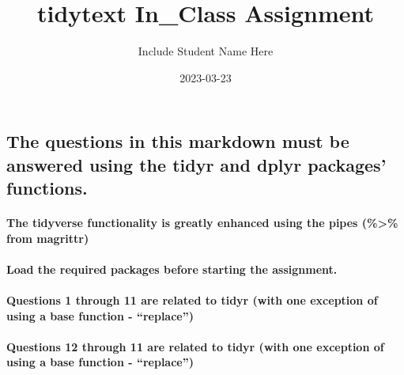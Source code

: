 \documentclass[
]{article}
\title{tidytext In\_Class Assignment}
\author{Include Student Name Here}
\date{2023-03-23}
\begin{document}
\maketitle

\hypertarget{the-questions-in-this-markdown-must-be-answered-using-the-tidyr-and-dplyr-packages-functions.}{%
\subsection{The questions in this markdown must be answered using the
tidyr and dplyr packages'
functions.}\label{the-questions-in-this-markdown-must-be-answered-using-the-tidyr-and-dplyr-packages-functions.}}

\hypertarget{the-tidyverse-functionality-is-greatly-enhanced-using-the-pipes-from-magrittr}{%
\paragraph{The tidyverse functionality is greatly enhanced using the
pipes (\%\textgreater\% from
magrittr)}\label{the-tidyverse-functionality-is-greatly-enhanced-using-the-pipes-from-magrittr}}

\hypertarget{load-the-required-packages-before-starting-the-assignment.}{%
\paragraph{Load the required packages before starting the
assignment.}\label{load-the-required-packages-before-starting-the-assignment.}}

\hypertarget{questions-1-through-11-are-related-to-tidyr-with-one-exception-of-using-a-base-function---replace}{%
\paragraph{Questions 1 through 11 are related to tidyr (with one
exception of using a base function -
``replace'')}\label{questions-1-through-11-are-related-to-tidyr-with-one-exception-of-using-a-base-function---replace}}

\hypertarget{questions-12-through-11-are-related-to-tidyr-with-one-exception-of-using-a-base-function---replace}{%
\paragraph{Questions 12 through 11 are related to tidyr (with one
exception of using a base function -
``replace'')}\label{questions-12-through-11-are-related-to-tidyr-with-one-exception-of-using-a-base-function---replace}}
\end{document}
